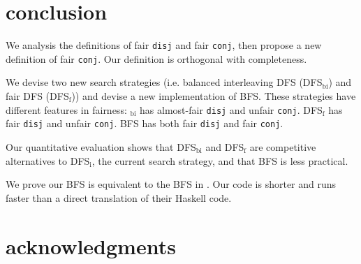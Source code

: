 \documentclass[format=acmlarge, review=true, authordraft=true]{acmart}
\newcommand{\conj}{\texttt{conj}}
\newcommand{\disj}{\texttt{disj}}
\begin{document}
\section{conclusion}

We analysis the definitions of fair \disj{} and fair \conj{}, then propose a 
new definition of fair \conj{}. Our definition is orthogonal with completeness.

We devise two new search strategies (i.e. balanced interleaving DFS 
(DFS$_\textrm{bi}$) and fair DFS (DFS$_\textrm{f}$)) and devise a new 
implementation of BFS. These strategies have different features 
in fairness: $_\textrm{bi}$ has almost-fair \disj{} and unfair \conj{}. 
DFS$_\textrm{f}$ has fair \disj{} and unfair \conj{}. BFS has both fair \disj{} 
and fair \conj{}.

Our quantitative evaluation shows that DFS$_\textrm{bi}$ and DFS$_\textrm{f}$ are competitive 
alternatives to DFS$_\textrm{i}$, the current search strategy, and that BFS is less 
practical.

We prove our BFS is equivalent to the BFS in \citet{seres1999algebra}. Our code 
is shorter and runs faster than a direct translation of their Haskell code.

\section*{acknowledgments}



\end{document}
